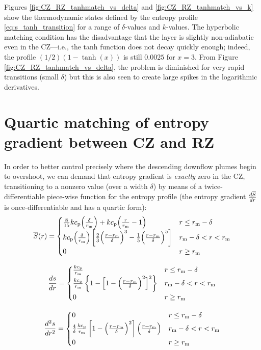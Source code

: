 \documentclass[12pt]{article} %
\newcommand{\rrm}{r_{\rm{m}}}
\begin{document}
Figures \ref{fig:CZ_RZ_tanhmatch_vs_delta} and \ref{fig:CZ_RZ_tanhmatch_vs_k} show the thermodynamic states defined by the entropy profile \eqref{eq:s_tanh_transition} for a range of $\delta$-values and $k$-values. The hyperbolic matching condition has the disadvantage that the layer is slightly non-adiabatic even in the CZ---i.e., the tanh function does not decay quickly enough; indeed, the profile $(1/2)(1-\tanh(x))$ is still $0.0025$ for $x=3$. From Figure \ref{fig:CZ_RZ_tanhmatch_vs_delta}, the problem is diminished for very rapid transitions (small $\delta$) but this is also seen to create large spikes in the logarithmic derivatives. 

\section{Quartic matching of entropy gradient between CZ and RZ}
 In order to better control precisely where the descending downflow plumes begin to overshoot, we can demand that entropy gradient is \textit{exactly} zero in the CZ, transitioning to a nonzero value (over a width $\delta$) by means of a twice-differentiable piece-wise function for the entropy profile (the entropy gradient $\frac{d\overline{S}}{dr}$ is once-differentiable and has a quartic form):
\begin{equation}\label{eq:s_quart_transition}
\sref\ofr = \begin{cases}
\frac{8}{15}k\cp\Big{(}\frac{\delta}{\rrm}\Big{)} + k\cp\Big{(}\frac{r}{\rrm} - 1\Big{)} &r\leq \rrm - \delta\\
k\cp\Big{(}\frac{\delta}{\rrm}\Big{)}\left[\frac{2}{3}\Big{(}\frac{r-\rrm}{\delta}\Big{)}^3 - \frac{1}{5} \Big{(}\frac{r-\rrm}{\delta}\Big{)}^5\right] & \rrm - \delta < r < \rrm\\
0 & r\geq \rrm
\end{cases}
\end{equation}

\begin{equation}\label{eq:dsdr_quart_transition}
\frac{ds}{dr} = \begin{cases}
\frac{k\cp}{\rrm} & r\leq \rrm - \delta\\
\frac{k\cp}{\rrm}\left\{1 - \Big{[}1 - \Big{(}\frac{r-\rrm}{\delta}\Big{)}^2\Big{]}^2\right\} & \rrm - \delta < r < \rrm\\
0 & r\geq \rrm
\end{cases}
\end{equation}

\begin{equation}\label{eq:d2sdr2_quart_transition}
\frac{d^2s}{dr^2} = \begin{cases}
0 & r\leq \rrm - \delta\\
\frac{4}{\delta}\frac{k\cp}{\rrm}\left[1 - \Big{(}\frac{r-\rrm}{\delta}\Big{)}^2\right]\Big{(}\frac{r-\rrm}{\delta}\Big{)} & \rrm - \delta < r < \rrm\\
0 & r\geq \rrm
\end{cases}
\end{equation}
\end{document}
